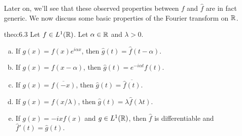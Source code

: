Later on, we'll see that these observed properties between $f$ and $\hat f$ 
are in fact generic. We now discuss some basic properties of the Fourier 
transform on $\mathbb{R}$. 

\begin{theo}{theo:6.3}
    Let $f \in L^1(\mathbb{R})$. Let $\alpha \in \mathbb{R}$ and $\lambda > 0$.
    \begin{enumerate}[(a)]
        \item If $g(x) = f(x)e^{i\alpha x}$, then $\hat g(t) = \hat f(t-\alpha)$. 
        \item If $g(x) = f(x-\alpha)$, then $\hat g(t) = e^{-i\alpha t} \hat f(t)$. 
        \item If $g(x) = \overline{f(-x)}$, then $\hat g(t) = \overline{\hat f(t)}$. 
        \item If $g(x) = f(x/\lambda)$, then $\hat g(t) = \lambda \hat f(\lambda t)$. 
        \item If $g(x) = -ixf(x)$ and $g \in L^1(\mathbb{R})$, then $\hat f$ is differentiable 
        and $\hat f'(t) = \hat g(t)$. 
    \end{enumerate}    
\end{theo}
